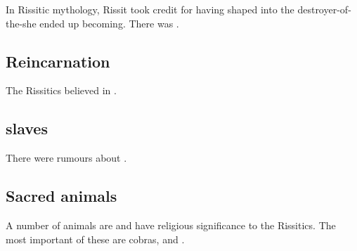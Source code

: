 \subsubsection{\Belzir}
In Rissitic mythology, Rissit took credit for having shaped \Belzir into the destroyer-of-the-\caliphate she ended up becoming.
There was . 










\subsection{Reincarnation}
The Rissitics believed in . 









\subsection{\Resphan slaves}
There were rumours about . 









\subsection{Sacred animals}
A number of animals are  and have religious significance to the Rissitics. 
The most important of these are cobras,  and . 








































